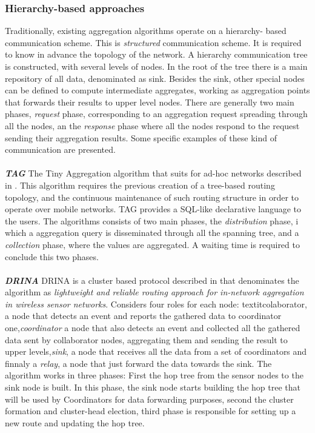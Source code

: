 \subsubsection{Hierarchy-based approaches} 

Traditionally, existing aggregation algorithms operate on a hierarchy-
based communication scheme. This is \textit{structured} communication scheme. It is required to know in advance the topology of the network. A hierarchy communication tree is constructed, with several levels of nodes. In the root of the tree there is a main repository of all data, denominated as sink. Besides the sink, other special nodes can be defined to compute intermediate aggregates, working as aggregation points that forwards their results to upper level nodes. There are generally two main phases, \textit{request} phase, corresponding to an aggregation request spreading through all the nodes, an the \textit{response} phase where all the nodes respond to the request sending their aggregation results. Some specific examples of these kind of communication are presented.\\
\\
\textbf{\textit{TAG}} The Tiny Aggregation algorithm that suits for ad-hoc networks described in \cite{madden2002tag}. This algorithm requires the previous creation of a tree-based routing topology, and the continuous maintenance of such routing structure in order to operate over mobile networks. TAG provides a SQL-like declarative language to the users. The algorithms consists of two main phases, the \textit{distribution} phase, i which a aggregation query is disseminated through all the spanning tree, and a \textit{collection} phase, where the values are aggregated. A waiting time is required to conclude this two phases.\\
\\ 
\textbf{\textit{DRINA}} DRINA is a cluster based protocol described in \cite{villas2013drina} that denominates the algorithm as \textit{lightweight and reliable routing approach for in-network aggregation in wireless sensor networks}. Considers four roles for each node: textit{colaborator}, a node that detects an event and reports the gathered data to coordinator one,\textit{coordinator} a node that also detects an event and  collected all the gathered data sent by collaborator nodes, aggregating them and sending the result to upper levels,\textit{sink}, a node that receives all the data from a set of coordinators and finnaly a \textit{relay}, a node that just forward the data towards the sink. The algorithm works in three phases: First the hop tree from the sensor nodes to the sink node is built. In this phase, the sink node starts building the hop tree that will be used by Coordinators for data forwarding purposes, second the cluster formation and cluster-head election, third phase is responsible for setting up a new route and updating the hop tree.\\ \\


